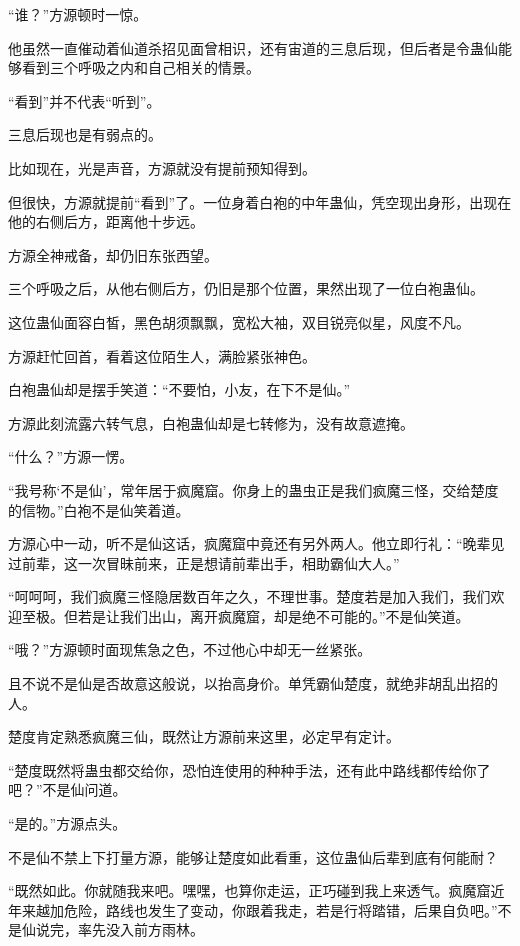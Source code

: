 \begin{this_body}
“谁？”方源顿时一惊。

他虽然一直催动着仙道杀招见面曾相识，还有宙道的三息后现，但后者是令蛊仙能够看到三个呼吸之内和自己相关的情景。

“看到”并不代表“听到”。

三息后现也是有弱点的。

比如现在，光是声音，方源就没有提前预知得到。

但很快，方源就提前“看到”了。一位身着白袍的中年蛊仙，凭空现出身形，出现在他的右侧后方，距离他十步远。

方源全神戒备，却仍旧东张西望。

三个呼吸之后，从他右侧后方，仍旧是那个位置，果然出现了一位白袍蛊仙。

这位蛊仙面容白皙，黑色胡须飘飘，宽松大袖，双目锐亮似星，风度不凡。

方源赶忙回首，看着这位陌生人，满脸紧张神色。

白袍蛊仙却是摆手笑道：“不要怕，小友，在下不是仙。”

方源此刻流露六转气息，白袍蛊仙却是七转修为，没有故意遮掩。

“什么？”方源一愣。

“我号称‘不是仙’，常年居于疯魔窟。你身上的蛊虫正是我们疯魔三怪，交给楚度的信物。”白袍不是仙笑着道。

方源心中一动，听不是仙这话，疯魔窟中竟还有另外两人。他立即行礼：“晚辈见过前辈，这一次冒昧前来，正是想请前辈出手，相助霸仙大人。”

“呵呵呵，我们疯魔三怪隐居数百年之久，不理世事。楚度若是加入我们，我们欢迎至极。但若是让我们出山，离开疯魔窟，却是绝不可能的。”不是仙笑道。

“哦？”方源顿时面现焦急之色，不过他心中却无一丝紧张。

且不说不是仙是否故意这般说，以抬高身价。单凭霸仙楚度，就绝非胡乱出招的人。

楚度肯定熟悉疯魔三仙，既然让方源前来这里，必定早有定计。

“楚度既然将蛊虫都交给你，恐怕连使用的种种手法，还有此中路线都传给你了吧？”不是仙问道。

“是的。”方源点头。

不是仙不禁上下打量方源，能够让楚度如此看重，这位蛊仙后辈到底有何能耐？

“既然如此。你就随我来吧。嘿嘿，也算你走运，正巧碰到我上来透气。疯魔窟近年来越加危险，路线也发生了变动，你跟着我走，若是行将踏错，后果自负吧。”不是仙说完，率先没入前方雨林。


\end{this_body}
